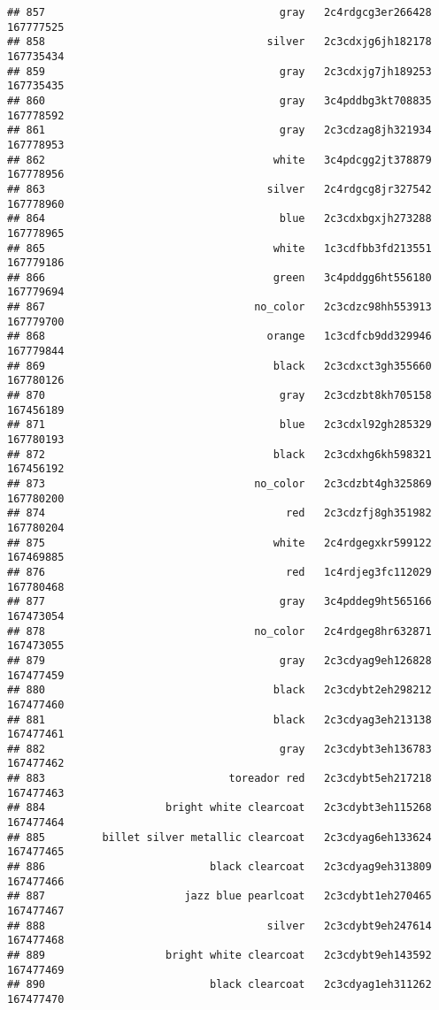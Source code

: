 \documentclass[
]{article}
\begin{document}
\begin{verbatim}
## 857                                     gray   2c4rdgcg3er266428 167777525
## 858                                   silver   2c3cdxjg6jh182178 167735434
## 859                                     gray   2c3cdxjg7jh189253 167735435
## 860                                     gray   3c4pddbg3kt708835 167778592
## 861                                     gray   2c3cdzag8jh321934 167778953
## 862                                    white   3c4pdcgg2jt378879 167778956
## 863                                   silver   2c4rdgcg8jr327542 167778960
## 864                                     blue   2c3cdxbgxjh273288 167778965
## 865                                    white   1c3cdfbb3fd213551 167779186
## 866                                    green   3c4pddgg6ht556180 167779694
## 867                                 no_color   2c3cdzc98hh553913 167779700
## 868                                   orange   1c3cdfcb9dd329946 167779844
## 869                                    black   2c3cdxct3gh355660 167780126
## 870                                     gray   2c3cdzbt8kh705158 167456189
## 871                                     blue   2c3cdxl92gh285329 167780193
## 872                                    black   2c3cdxhg6kh598321 167456192
## 873                                 no_color   2c3cdzbt4gh325869 167780200
## 874                                      red   2c3cdzfj8gh351982 167780204
## 875                                    white   2c4rdgegxkr599122 167469885
## 876                                      red   1c4rdjeg3fc112029 167780468
## 877                                     gray   3c4pddeg9ht565166 167473054
## 878                                 no_color   2c4rdgeg8hr632871 167473055
## 879                                     gray   2c3cdyag9eh126828 167477459
## 880                                    black   2c3cdybt2eh298212 167477460
## 881                                    black   2c3cdyag3eh213138 167477461
## 882                                     gray   2c3cdybt3eh136783 167477462
## 883                             toreador red   2c3cdybt5eh217218 167477463
## 884                   bright white clearcoat   2c3cdybt3eh115268 167477464
## 885         billet silver metallic clearcoat   2c3cdyag6eh133624 167477465
## 886                          black clearcoat   2c3cdyag9eh313809 167477466
## 887                      jazz blue pearlcoat   2c3cdybt1eh270465 167477467
## 888                                   silver   2c3cdybt9eh247614 167477468
## 889                   bright white clearcoat   2c3cdybt9eh143592 167477469
## 890                          black clearcoat   2c3cdyag1eh311262 167477470

\end{verbatim}
\end{document}
